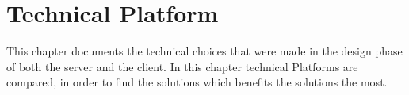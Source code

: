 \chapter{Technical Platform}\label{cha:technicalPlatform}

This chapter documents the technical choices that were made in the design phase of both the server and the client. In this chapter technical Platforms are compared, in order to find the solutions which benefits the solutions the most. 







